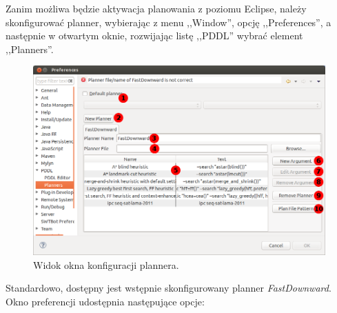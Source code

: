 Zanim możliwa będzie aktywacja planowania z poziomu Eclipse, należy skonfigurować planner, wybierając z menu ,,Window'', opcję ,,Preferences'', a następnie w otwartym oknie, rozwijając listę ,,PDDL'' wybrać element ,,Planners''.

\newpage
\begin{figure}[h!]
    \centering
    \includegraphics[width=\textwidth]{img/planner_preferences_window}
    \caption{Widok okna konfiguracji plannera.}
    \label{fig:preferences_window}
\end{figure}
Standardowo, dostępny jest wstępnie skonfigurowany planner \textit{FastDownward}. Okno preferencji udostępnia następujące opcje:
